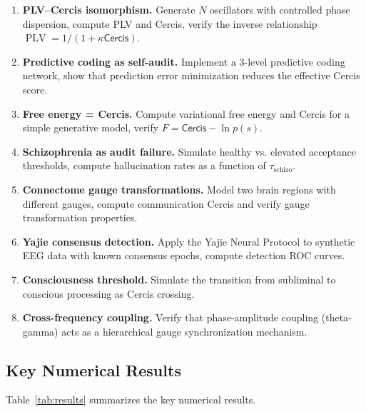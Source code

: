 \documentclass[12pt,a4paper]{article}
\theoremstyle{remark}
\newcommand{\Cercis}{\textsf{Cercis}}
\newcommand{\FreeEnergy}{F}
\DeclareMathOperator{\PLV}{PLV}
\begin{document}
\begin{enumerate}[label=\textbf{V\arabic*}, leftmargin=*]
    \item \textbf{PLV--Cercis isomorphism.} Generate $N$ oscillators with
          controlled phase dispersion, compute PLV and \Cercis{}, verify the
          inverse relationship $\PLV = 1/(1 + \kappa \Cercis)$.
    \item \textbf{Predictive coding as self-audit.} Implement a 3-level
          predictive coding network, show that prediction error minimization
          reduces the effective \Cercis{} score.
    \item \textbf{Free energy = Cercis.} Compute variational free energy and
          \Cercis{} for a simple generative model, verify $\FreeEnergy =
          \Cercis - \ln p(s)$.
    \item \textbf{Schizophrenia as audit failure.} Simulate healthy vs. elevated
          acceptance thresholds, compute hallucination rates as a function of
          $\tau_{\text{schizo}}$.
    \item \textbf{Connectome gauge transformations.} Model two brain regions
          with different gauges, compute communication \Cercis{} and verify
          gauge transformation properties.
    \item \textbf{Yajie consensus detection.} Apply the Yajie Neural Protocol
          to synthetic EEG data with known consensus epochs, compute detection
          ROC curves.
    \item \textbf{Consciousness threshold.} Simulate the transition from
          subliminal to conscious processing as \Cercis{} crossing.
    \item \textbf{Cross-frequency coupling.} Verify that phase-amplitude
          coupling (theta-gamma) acts as a hierarchical gauge synchronization
          mechanism.
\end{enumerate}

\subsection{Key Numerical Results}

Table~\ref{tab:results} summarizes the key numerical results.
\end{document}
